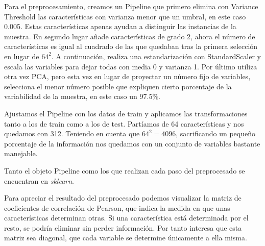 \documentclass[a4]{article}
\begin{document}
Para el preprocesamiento, creamos un Pipeline que primero elimina con
Variance Threshold las características con varianza menor que un
umbral, en este caso 0.005. Estas características apenas ayudan a
distinguir las instancias de la muestra. En segundo lugar añade
características de grado 2, ahora el número de características es
igual al cuadrado de las que quedaban tras la primera selección en
lugar de $64^2$. A continuación, realiza una estandarización con
StandardScaler y escala las variables para dejar todas con media 0 y
varianza 1. Por último utiliza otra vez PCA, pero esta vez en lugar de
proyectar un número fijo de variables, selecciona el menor número
posible que expliquen cierto porcentaje de la variabilidad de la
muestra, en este caso un 97.5\%.

Ajustamos el Pipeline con los datos de train y aplicamos las
transformaciones tanto a los de train como a los de test. Partíamos de
64 características y nos quedamos con 312. Teniendo en cuenta que
$64^2=4096$, sacrificando un pequeño porcentaje de la información
nos quedamos con un conjunto de variables bastante manejable.

Tanto el objeto Pipeline como los que realizan cada paso del
preprocesado se encuentran en \textit{sklearn}.

Para apreciar el resultado del preprocesado podemos visualizar la
matriz de coeficientes de correlación de Pearson, que indica la medida
en que unas características determinan otras. Si una característica
está determinada por el resto, se podría eliminar sin perder
información. Por tanto interesa que esta matriz sea diagonal, que cada
variable se determine únicamente a ella misma.
\end{document}

